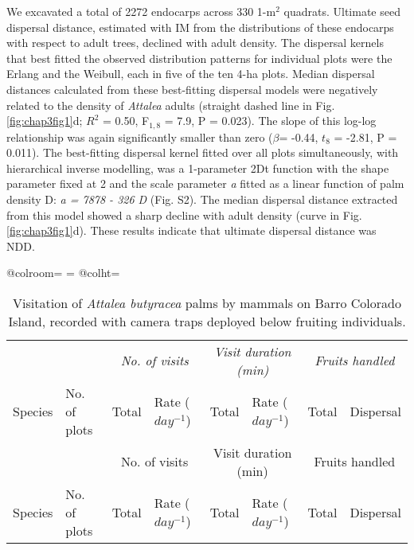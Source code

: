 \documentclass[b5paper,justified]{tufte-book} %
\begin{document}
\begin{fullwidth}
We excavated a total of 2272 endocarps across 330 1-m$^2$ quadrats. Ultimate seed dispersal distance, estimated with IM from the distributions of these endocarps with respect to adult trees, declined with adult density. The dispersal kernels that best fitted the observed distribution patterns for individual plots were the Erlang and the Weibull, each in five of the ten 4-ha plots. Median dispersal distances calculated from these best-fitting dispersal models were negatively related to the density of \textit{Attalea} adults (straight dashed line in Fig. \ref{fig:chap3fig1}d; $R^2$ = 0.50, F$_{1,8}$ = 7.9, P = 0.023). The slope of this log-log relationship was again significantly smaller than zero ($\beta$= -0.44, $t_8$ = -2.81, P = 0.011). The best-fitting dispersal kernel fitted over all plots simultaneously, with hierarchical inverse modelling, was a 1-parameter 2Dt function with the shape parameter fixed at 2 and the scale parameter \textit{a} fitted as a linear function of palm density D: \textit{a = 7878 - 326 D} (Fig. S2). The median dispersal distance extracted from this model showed a sharp decline with adult density (curve in Fig.\ref{fig:chap3fig1}d). These results indicate that ultimate dispersal distance was NDD.

\begin{landscape}
\advance{}
\csname @colroom\endcsname=\vsize
\textheight=\vsize
\csname @colht\endcsname=\vsize
\small
     \begin{longtable}{@{}p{7cm}p{1cm}p{1cm}p{1cm}p{1cm}p{1cm}p{1cm}p{1cm}}
\caption{Visitation of \textit{Attalea butyracea} palms by mammals on Barro Colorado Island, recorded with camera traps deployed below fruiting individuals.}
\label{tab:chap3tab1}\\
\hline
{} & {}& \multicolumn{2}{c}{\emph{No. of visits}} & \multicolumn{2}{c}{\emph{Visit duration (min)} }& \multicolumn{2}{c}{\emph{Fruits handled}}  \\
Species &  No. of plots & Total & Rate ($day^{-1}$) & Total & Rate ($day^{-1}$) & Total & Dispersal \\

\hline

\endfirsthead
\hline

{} & {}& \multicolumn{2}{c}{No. of visits} & \multicolumn{2}{c}{Visit duration (min)} & \multicolumn{2}{c}{Fruits handled}  \\
Species &  No. of plots & Total & Rate ($day^{-1}$) & Total & Rate ($day^{-1}$) & Total & Dispersal \\


\end{longtable}
\end{landscape}
\end{fullwidth}
\end{document}
